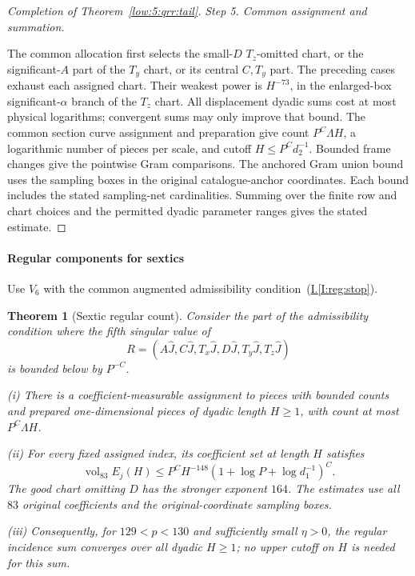 \documentclass[11pt]{amsart}
\newtheorem{theorem}{Theorem}[section]
\theoremstyle{definition}
\theoremstyle{remark}
\numberwithin{equation}{section}
\newcommand{\partIref}[1]{\hyperref[I:#1]{I.\ref*{I:#1}}}
\newcommand{\partIeqref}[1]{\textup{(\partIref{#1})}}
\begin{document}
\begin{proof}[Completion of Theorem~\ref{low:5:qrr:tail}]
\par\smallskip\noindent\textit{Step 5. Common assignment and summation.}\par\nobreak\smallskip

The common allocation first selects the small-$D$ $T_z$-omitted chart, or the significant-$A$ part of the $T_y$ chart, or its central $C,T_y$ part. The preceding cases exhaust each assigned chart. Their weakest power is $H^{-73}$, in the enlarged-box significant-$\alpha$ branch of the $T_z$ chart. All displacement dyadic sums cost at most physical logarithms; convergent sums may only improve that bound. The common section curve assignment and preparation give count $P^C\Lambda H$, a logarithmic number of pieces per scale, and cutoff $H\le P^Cd_2^{-1}$. Bounded frame changes give the pointwise Gram comparisons. The anchored Gram union bound uses the sampling boxes in the original catalogue-anchor coordinates. Each bound includes the stated sampling-net cardinalities. Summing over the finite row and chart choices and the permitted dyadic parameter ranges gives the stated estimate.
\end{proof}

\paragraph{Regular components for sextics}

Use $V_6$ with the common augmented admissibility condition~\partIeqref{reg:stop}.

\begin{theorem}[Sextic regular count]\label{low:6:s6r:theorem}
Consider the part of the admissibility condition where the fifth singular value of
\[
R=(A\widehat J,C\widehat J,T_x\widehat J,D\widehat J,T_y\widehat J,T_z\widehat J)
\]
is bounded below by $P^{-C}$.

\noindent\textup{(i)} There is a coefficient-measurable assignment to pieces with bounded counts and prepared one-dimensional pieces of dyadic length $H\ge1$, with count at most $P^C\Lambda H$.

\noindent\textup{(ii)} For every fixed assigned index, its coefficient set at length $H$ satisfies
\begin{equation}\label{low:6:s6r:tail}
\operatorname{vol}_{83}E_j(H)\le P^C H^{-148}(1+\log P+\log d_1^{-1})^C.
\end{equation}
The good chart omitting $D$ has the stronger exponent $164$. The estimates use all $83$ original coefficients and the original-coordinate sampling boxes.

\noindent\textup{(iii)} Consequently, for $129<p<130$ and sufficiently small $\eta>0$, the regular incidence sum converges over all dyadic $H\ge1$; no upper cutoff on $H$ is needed for this sum.
\end{theorem}
\end{document}
